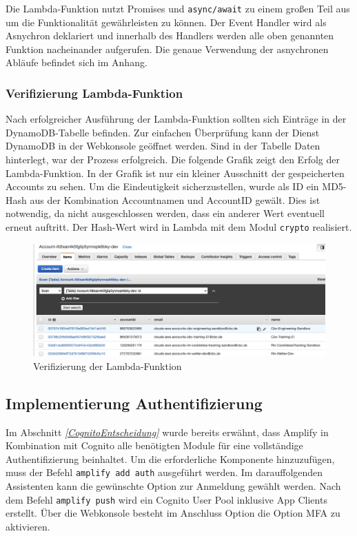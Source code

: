 Die Lambda-Funktion nutzt Promises und \verb+async/await+ zu einem großen Teil aus um die Funktionalität gewährleisten zu können.
Der Event Handler wird als Asnychron deklariert und innerhalb des Handlers werden alle oben genannten Funktion nacheinander aufgerufen.
Die genaue Verwendung der asnychronen Abläufe befindet sich im Anhang.

\subsubsection{Verifizierung Lambda-Funktion}

Nach erfolgreicher Ausführung der Lambda-Funktion sollten sich Einträge in der DynamoDB-Tabelle befinden.
Zur einfachen Überprüfung kann der Dienst DynamoDB in der Webkonsole geöffnet werden.
Sind in der Tabelle Daten hinterlegt, war der Prozess erfolgreich.
Die folgende Grafik zeigt den Erfolg der Lambda-Funktion.
In der Grafik ist nur ein kleiner Ausschnitt der gespeicherten Accounts zu sehen.
Um die Eindeutigkeit sicherzustellen, wurde als ID ein MD5-Hash aus der Kombination Accountnamen und AccountID gewält.
Dies ist notwendig, da nicht ausgeschlossen werden, dass ein anderer Wert eventuell erneut auftritt.
Der Hash-Wert wird in Lambda mit dem Modul \verb+crypto+ realisiert.

\begin{figure}[htbp]
    \centering
    \includegraphics[width=1.0\textwidth]{50-Implementierung/DynamoWeb.png}
    \caption{Verifizierung der Lambda-Funktion}
    \label{fig:meine-grafik}
\end{figure}


\subsection{Implementierung Authentifizierung}
\label{ImpAuth}
Im Abschnitt \textit{\ref{CognitoEntscheidung} } wurde bereits erwähnt, dass Amplify in Kombination mit Cognito
alle benötigten Module für eine vollständige Authentifizierung beinhaltet.
Um die erforderliche Komponente hinzuzufügen, muss der Befehl \verb+amplify add auth+ ausgeführt werden.
Im darauffolgenden Assistenten kann die gewünschte Option zur Anmeldung gewählt werden.
Nach dem Befehl \verb+amplify push+ wird ein Cognito User Pool inklusive App Clients erstellt.
Über die Webkonsole besteht im Anschluss Option die Option MFA zu aktivieren.

